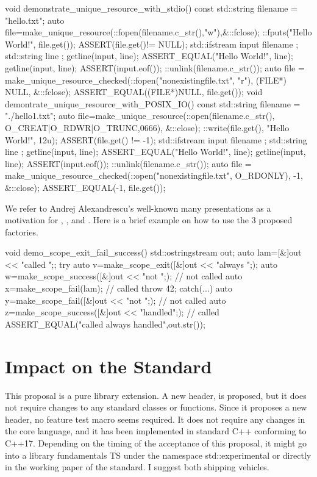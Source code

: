 \documentclass[ebook,11pt,article]{memoir}
\begin{document}
\begin{codeblock}
void demonstrate_unique_resource_with_stdio() {
  const std::string filename = "hello.txt";
  { auto file=make_unique_resource(::fopen(filename.c_str(),"w"),&::fclose);
    ::fputs("Hello World!\n", file.get());
    ASSERT(file.get()!= NULL);
  }
  { std::ifstream input { filename };
    std::string line { };
    getline(input, line);
    ASSERT_EQUAL("Hello World!", line);
    getline(input, line);
    ASSERT(input.eof());
  }
  ::unlink(filename.c_str());
  {
    auto file = make_unique_resource_checked(::fopen("nonexistingfile.txt", "r"), 
                (FILE*) NULL, &::fclose);
    ASSERT_EQUAL((FILE*)NULL, file.get());
  }
}
void demontrate_unique_resource_with_POSIX_IO() {
  const std::string filename = "./hello1.txt";
  { auto file=make_unique_resource(::open(filename.c_str(),
                     O_CREAT|O_RDWR|O_TRUNC,0666), &::close);
    ::write(file.get(), "Hello World!\n", 12u);
    ASSERT(file.get() != -1);
  }
  { std::ifstream input { filename };
    std::string line { };
    getline(input, line);
    ASSERT_EQUAL("Hello World!", line);
    getline(input, line);
    ASSERT(input.eof());
  }
  ::unlink(filename.c_str());
  {
    auto file = make_unique_resource_checked(::open("nonexistingfile.txt", 
                       O_RDONLY), -1, &::close);
    ASSERT_EQUAL(-1, file.get());
  }
}\end{codeblock}

We refer to Andrej Alexandrescu's well-known many presentations as a motivation for , , and . Here is a brief example on how to use the 3 proposed factories. 
\begin{codeblock}
void demo_scope_exit_fail_success(){
  std::ostringstream out{};
  auto lam=[&]{out << "called ";};
  try{
    auto v=make_scope_exit([&]{out << "always ";});
    auto w=make_scope_success([&]{out << "not ";}); // not called
    auto x=make_scope_fail(lam); // called
    throw 42;
  }catch(...){
    auto y=make_scope_fail([&]{out << "not ";}); // not called
    auto z=make_scope_success([&]{out << "handled";}); // called
  }
  ASSERT_EQUAL("called always handled",out.str());
}
\end{codeblock}


\chapter{Impact on the Standard}
This proposal is a pure library extension. A new header,  is proposed, but it does not require changes to any standard classes or functions. Since it proposes a new header, no feature test macro seems required. It does not require any changes in the core language, and it has been implemented in standard C++ conforming to C++17. Depending on the timing of the acceptance of this proposal, it might go into a library fundamentals TS under the namespace std::experimental or directly in the working paper of the standard. I suggest both shipping vehicles.
\end{document}
